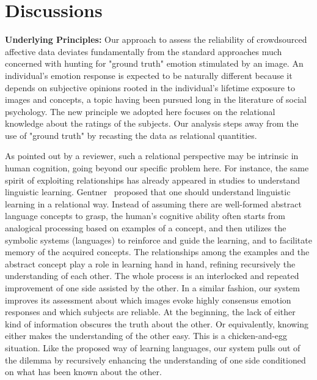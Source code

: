 \documentclass[10pt,journal,letterpaper,compsoc,twoside]{IEEEtran}
\begin{document}
\section{Discussions}
{\textbf{Underlying Principles:} 
Our approach to assess the reliability of crowdsourced affective data deviates fundamentally from the standard approaches much concerned with hunting for "ground truth" emotion stimulated by an image.  An individual's emotion response is expected to be naturally different because it depends on subjective opinions rooted in the individual's lifetime exposure to images and concepts, a topic having been pursued long in the literature of social psychology. 
The new principle we adopted here focuses on the relational knowledge about the ratings of the subjects. Our analysis steps away from the use of "ground truth" by recasting the data as relational quantities.}

{
As pointed out by a reviewer, such a relational perspective may be intrinsic in human cognition, going beyond our specific problem here. For instance,
the same spirit of exploiting relationships has already appeared in studies to understand linguistic learning. Gentner~\cite{gentner2010bootstrapping,gentner2010mutual} proposed that one should understand linguistic learning in a relational way. Instead of assuming there are well-formed abstract language concepts to grasp, the human's cognitive ability often starts from analogical processing based on examples of a concept, and then utilizes the symbolic systems (languages) to reinforce and guide the learning, and to facilitate memory of the acquired concepts. The relationships among the examples and the abstract concept play a role in learning hand in hand, refining recursively the understanding of each other. The whole process is an interlocked and repeated improvement of one side assisted by the other. In a similar fashion, our system improves its assessment about which images evoke highly consensus emotion responses and which subjects are reliable. At the beginning, the lack of either kind of information obscures the truth about the other. Or equivalently, knowing either makes the understanding of the other easy. This is a chicken-and-egg situation. Like the proposed way of learning languages, our system pulls out of the dilemma by recursively enhancing the understanding of one side conditioned on what has been known about the other. 
}\\
\end{document}
